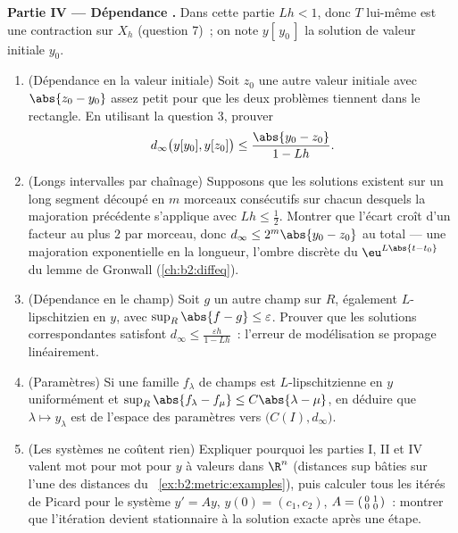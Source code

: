 \begin{problem}
\medskip
\noindent\textbf{Partie IV --- Dépendance .} Dans cette
partie $Lh < 1$, donc $T$ lui-même est une contraction sur $X_h$
(question 7)~; on note $y[\,y_0\,]$ la solution de valeur initiale
$y_0$.
\begin{enumerate}[resume]
  \item (Dépendance en la valeur initiale) Soit $z_0$ une autre
        valeur initiale avec $\abs{z_0 - y_0}$ assez petit pour que
        les deux problèmes tiennent dans le rectangle. En utilisant
        la question 3, prouver
        \[
        d_\infty\bigl(y[y_0], y[z_0]\bigr) \leq
        \frac{\abs{y_0 - z_0}}{1 - Lh}.
        \]
  \item (Longs intervalles par chaînage) Supposons que les solutions
        existent sur un long segment découpé en $m$ morceaux
        consécutifs sur chacun desquels la majoration précédente
        s'applique avec $Lh \leq \frac12$. Montrer que l'écart croît
        d'un facteur au plus $2$ par morceau, donc $d_\infty \leq
        2^m\abs{y_0 - z_0}$ au total --- une majoration exponentielle
        en la longueur, l'ombre discrète du $\eu^{L\abs{t - t_0}}$
        du lemme de Gronwall (\cref{ch:b2:diffeq}).
  \item (Dépendance en le champ) Soit $g$ un autre champ sur $R$,
        également $L$-lipschitzien en $y$, avec $\sup_R \abs{f - g}
        \leq \varepsilon$. Prouver que les solutions correspondantes
        satisfont $d_\infty \leq \frac{\varepsilon h}{1 - Lh}$~:
        l'erreur de modélisation se propage linéairement.
  \item (Paramètres) Si une famille $f_\lambda$ de champs est
        $L$-lipschitzienne en $y$ uniformément et $\sup_R\abs{f_\lambda
        - f_\mu} \leq C\abs{\lambda - \mu}$, en déduire que $\lambda
        \mapsto y_\lambda$ est  de l'espace des
        paramètres vers $\bigl(C(I), d_\infty\bigr)$.
  \item (Les systèmes ne coûtent rien) Expliquer pourquoi les
        parties I, II et IV valent mot pour mot pour $y$ à valeurs
        dans $\R^n$ (distances sup bâties sur l'une des distances du~%
        \cref{ex:b2:metric:examples}), puis calculer tous les itérés
        de Picard pour le système $y' = Ay$, $y(0) = (c_1, c_2)$, $A
        = \begin{psmallmatrix} 0 & 1\\ 0 & 0\end{psmallmatrix}$~:
        montrer que l'itération devient stationnaire à la solution
        exacte après une étape.
\end{enumerate}


\end{problem}
